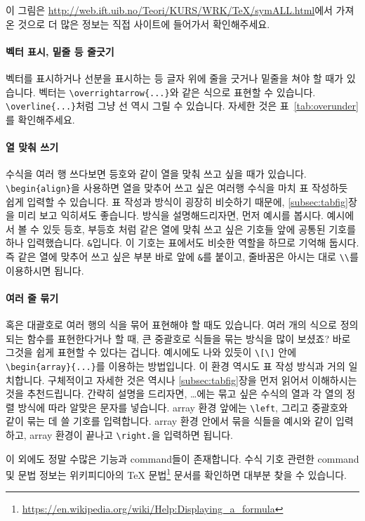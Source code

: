 이 그림은 \url{http://web.ift.uib.no/Teori/KURS/WRK/TeX/symALL.html}에서 가져온 것으로 더 많은 정보는 직접 사이트에 들어가서 확인해주세요.

\paragraph{벡터 표시, 밑줄 등 줄긋기}
벡터를 표시하거나 선분을 표시하는 등 글자 위에 줄을 긋거나 밑줄을 쳐야 할 때가 있습니다.
벡터는 \verb|\overrightarrow{...}|와 같은 식으로 표현할 수 있습니다.
\verb|\overline{...}|처럼 그냥 선 역시 그릴 수 있습니다.
자세한 것은 표~\ref{tab:overunder}를 확인해주세요.

\paragraph{열 맞춰 쓰기}
수식을 여러 행 쓰다보면 등호와 같이 열을 맞춰 쓰고 싶을 때가 있습니다.
\verb|\begin{align}|을 사용하면 열을 맞추어 쓰고 싶은 여러행 수식을 마치 표 작성하듯 쉽게 입력할 수 있습니다.
표 작성과 방식이 굉장히 비슷하기 때문에, \ref{subsec:tabfig}장을 미리 보고 익히셔도 좋습니다.
방식을 설명해드리자면, 먼저 예시를 봅시다.
예시에서 볼 수 있듯 등호, 부등호 처럼 같은 열에 맞춰 쓰고 싶은 기호들 앞에 공통된 기호를 하나 입력했습니다.
\verb|&|입니다. 이 기호는 표에서도 비슷한 역할을 하므로 기억해 둡시다.
즉 같은 열에 맞추어 쓰고 싶은 부분 바로 앞에 \verb|&|를 붙이고, 줄바꿈은 아시는 대로 \verb|\\|를 이용하시면 됩니다.

\paragraph{여러 줄 묶기}
혹은 대괄호로 여러 행의 식을 묶어 표현해야 할 때도 있습니다.
여러 개의 식으로 정의되는 함수를 표현한다거나 할 때, 큰 중괄호로 식들을 묶는 방식을 많이 보셨죠?
바로 그것을 쉽게 표현할 수 있다는 겁니다.
예시에도 나와 있듯이 \verb|\[\]| 안에 \verb|\begin{array}{...}|를 이용하는 방법입니다.
이 환경 역시도 표 작성 방식과 거의 일치합니다.
구체적이고 자세한 것은 역시나 \ref{subsec:tabfig}장을 먼저 읽어서 이해하시는 것을 추천드립니다.
간략히 설명을 드리자면, \dots 에는 묶고 싶은 수식의 열과 각 열의 정렬 방식에 따라 알맞은 문자를 넣습니다.
array 환경 앞에는 \verb|\left|, 그리고 중괄호와 같이 묶는 데 쓸 기호를 입력합니다.
array 환경 안에서 묶을 식들을 예시와 같이 입력하고, array 환경이 끝나고 \verb|\right.|을 입력하면 됩니다.

이 외에도 정말 수많은 기능과 command들이 존재합니다.
수식 기호 관련한 command 및 문법 정보는 위키피디아의 TeX 문법\footnote{\url{https://en.wikipedia.org/wiki/Help:Displaying_a_formula}} 문서를 확인하면 대부분 찾을 수 있습니다.

